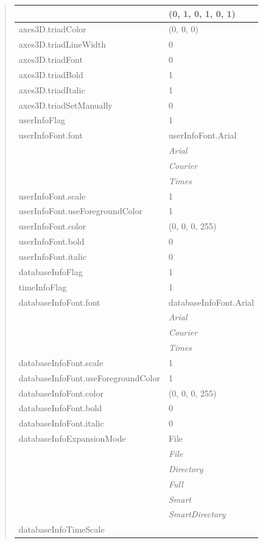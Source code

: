 \documentclass[letterpaper,10pt,english]{sphinxmanual}
\begin{document}
\begin{quote}
\begin{longtable}{|l|l|}
 & 
(0, 1, 0, 1, 0, 1)
\\
\hline
axes3D.triadColor
 & 
(0, 0, 0)
\\
\hline
axes3D.triadLineWidth
 & 
0
\\
\hline
axes3D.triadFont
 & 
0
\\
\hline
axes3D.triadBold
 & 
1
\\
\hline
axes3D.triadItalic
 & 
1
\\
\hline
axes3D.triadSetManually
 & 
0
\\
\hline
userInfoFlag
 & 
1
\\
\hline
userInfoFont.font
 & 
userInfoFont.Arial
\\
\hline & 
\emph{Arial}
\\
\hline & 
\emph{Courier}
\\
\hline & 
\emph{Times}
\\
\hline
userInfoFont.scale
 & 
1
\\
\hline
userInfoFont.useForegroundColor
 & 
1
\\
\hline
userInfoFont.color
 & 
(0, 0, 0, 255)
\\
\hline
userInfoFont.bold
 & 
0
\\
\hline
userInfoFont.italic
 & 
0
\\
\hline
databaseInfoFlag
 & 
1
\\
\hline
timeInfoFlag
 & 
1
\\
\hline
databaseInfoFont.font
 & 
databaseInfoFont.Arial
\\
\hline & 
\emph{Arial}
\\
\hline & 
\emph{Courier}
\\
\hline & 
\emph{Times}
\\
\hline
databaseInfoFont.scale
 & 
1
\\
\hline
databaseInfoFont.useForegroundColor
 & 
1
\\
\hline
databaseInfoFont.color
 & 
(0, 0, 0, 255)
\\
\hline
databaseInfoFont.bold
 & 
0
\\
\hline
databaseInfoFont.italic
 & 
0
\\
\hline
databaseInfoExpansionMode
 & 
File
\\
\hline & 
\emph{File}
\\
\hline & 
\emph{Directory}
\\
\hline & 
\emph{Full}
\\
\hline & 
\emph{Smart}
\\
\hline & 
\emph{SmartDirectory}
\\
\hline
databaseInfoTimeScale

\end{longtable}
\end{quote}
\end{document}
